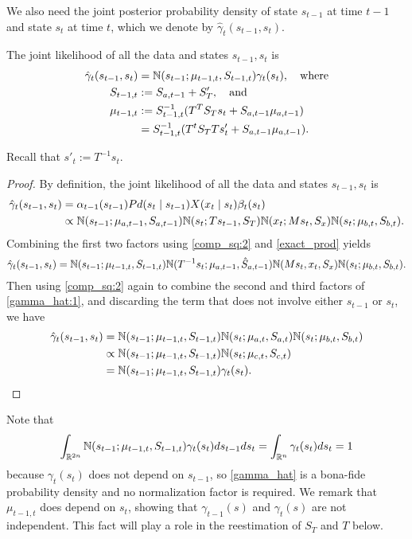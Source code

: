 \documentclass[12pt,leqno]{article}
\begin{document}
We also need the joint posterior probability density of state $s_{t-1}$ at time $t-1$ and state $s_t$ at time $t$,
which we denote by $\hat{\gamma}_t(s_{t-1},s_t)$.
\begin{Lem}\label{gamma_hat}
The joint likelihood of all the data and states $s_{t-1},s_t$ is
\begin{align*}
  \hat{\gamma}_t(s_{t-1},s_t) &= {\mathbb N}(s_{t-1};\mu_{t-1,t},S_{t-1,t})\gamma_t(s_t), \quad\text{where} \\
  S_{t-1,t} &:= S_{a,t-1}+S_T',\quad\text{and}\\
  \mu_{t-1,t} &:= S_{t-1,t}^{-1}(T^TS_Ts_t + S_{a,t-1}\mu_{a,t-1})\\
  &= S_{t-1,t}^{-1}(T^{t}S_TTs'_t + S_{a,t-1}\mu_{a,t-1}).\\
\end{align*}
\end{Lem}
Recall that $s'_t := T^{-1}s_t$.
\begin{proof}
  By definition, the joint likelihood of all the data and states $s_{t-1},s_t$ is 
  \begin{align*}
    \hat{\gamma}_t(s_{t-1},s_t) &= \alpha_{t-1}(s_{t-1})Pd(s_t\mid s_{t-1})X(x_t\mid s_t)\beta_t(s_t) \\
    &\propto {\mathbb N}(s_{t-1};\mu_{a,t-1},S_{a,t-1}){\mathbb N}(s_t;Ts_{t-1},S_T){\mathbb N}(x_t;Ms_t,S_x){\mathbb N}(s_t;\mu_{b,t},S_{b,t}).
  \end{align*}
  Combining the first two factors using \eqref{comp_sq:2} and \eqref{exact_prod} yields
  \begin{equation}\label{gamma_hat:1}
    \hat{\gamma}_t(s_{t-1},s_t) = {\mathbb N}(s_{t-1};\mu_{t-1,t},S_{t-1,t}){\mathbb N}(T^{-1}s_t;\mu_{a,t-1},\hat{S}_{a,t-1}){\mathbb N}(Ms_t,x_t,S_x){\mathbb N}(s_t;\mu_{b,t},S_{b,t}).
  \end{equation}
  Then using \eqref{comp_sq:2} again to combine the second and third factors of \eqref{gamma_hat:1}, and discarding
  the term that does not involve either $s_{t-1}$ or $s_t$, we have
    \begin{align*}
      \hat{\gamma}_t(s_{t-1},s_t) &= {\mathbb N}(s_{t-1};\mu_{t-1,t},S_{t-1,t}){\mathbb N}(s_t;\mu_{a,t},S_{a,t}){\mathbb N}(s_t;\mu_{b,t},S_{b,t})\\
      &\propto {\mathbb N}(s_{t-1};\mu_{t-1,t},S_{t-1,t}){\mathbb N}(s_t;\mu_{c,t},S_{c,t})\\ 
      &= {\mathbb N}(s_{t-1};\mu_{t-1,t},S_{t-1,t})\gamma_t(s_t).
    \end{align*}
\end{proof}
  Note that
  $$
  \int_{{\mathbb R}^{2n}}{\mathbb N}(s_{t-1};\mu_{t-1,t},S_{t-1,t})\gamma_t(s_t)ds_{t-1}ds_t = \int_{{\mathbb R}^n}\gamma_t(s_t)ds_t = 1 
  $$
  because $\gamma_t(s_t)$ does not depend on $s_{t-1}$, so \eqref{gamma_hat} is a bona-fide probability density and no
  normalization factor is required.  We remark that $\mu_{t-1,t}$ does depend on $s_t$, showing that $\gamma_{t-1}(s)$
  and $\gamma_t(s)$ are not independent.  This fact will play a role in the reestimation of $S_T$ and $T$ below.
  
\end{document}
